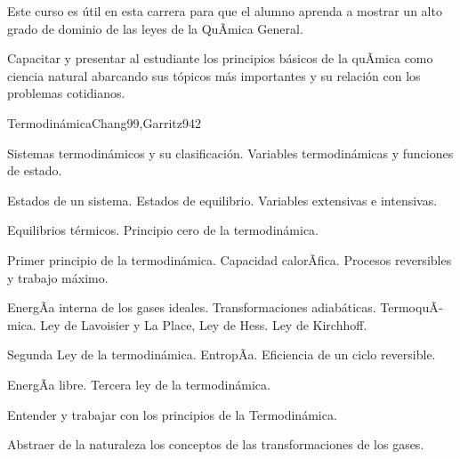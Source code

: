 \begin{syllabus}


\begin{justification}
Este curso es útil en esta carrera para que el alumno aprenda a mostrar un alto grado de dominio de las leyes de la QuÃ­mica General.
\end{justification}

\begin{goals}
\item Capacitar y presentar al estudiante los principios básicos de la quÃ­mica como ciencia natural abarcando sus tópicos más importantes y su relación con los problemas cotidianos.
\end{goals}

\begin{outcomes}
\end{outcomes}

\begin{unit}{Termodinámica}{Chang99,Garritz94}{2}
\begin{topics}
	\item Sistemas termodinámicos y su clasificación. Variables termodinámicas y funciones de estado.
	\item Estados de un sistema. Estados de equilibrio. Variables extensivas e intensivas.
	\item Equilibrios térmicos. Principio cero de la termodinámica.
	\item Primer principio de la termodinámica. Capacidad calorÃ­fica. Procesos reversibles y trabajo máximo.
	\item EnergÃ­a interna de los gases ideales. Transformaciones adiabáticas. TermoquÃ­mica. Ley de Lavoisier y La Place, Ley de Hess. Ley de Kirchhoff.
	\item Segunda Ley de la termodinámica. EntropÃ­a. Eficiencia de un ciclo reversible.
	\item EnergÃ­a libre. Tercera ley de la termodinámica.
\end{topics}

\begin{unitgoals}
	\item Entender y trabajar con los principios de la Termodinámica.
	\item Abstraer de la naturaleza los conceptos de las transformaciones de los gases.
\end{unitgoals}
\end{unit}


\end{syllabus}
